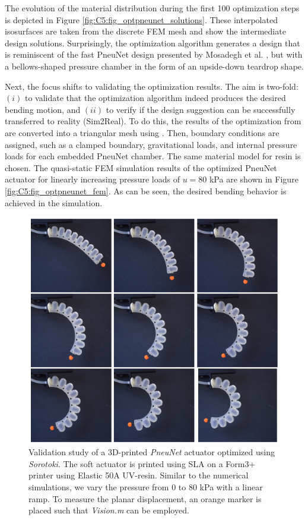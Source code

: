 The evolution of the material distribution during the first 100 optimization steps is depicted in Figure \ref{fig:C5:fig_optpneunet_solutions}. These interpolated isosurfaces are taken from the discrete FEM mesh and show the intermediate design solutions. Surprisingly, the optimization algorithm generates a design that is reminiscent of the fast PneuNet design presented by Mosadegh et al. \cite{Mosadegh2014}, but with a bellows-shaped pressure chamber in the form of an upside-down teardrop shape.

Next, the focus shifts to validating the optimization results. The aim is two-fold: $(i)$ to validate that the optimization algorithm indeed produces the desired bending motion, and $(ii)$ to verify if the design suggestion can be successfully transferred to reality (Sim2Real). To do this, the results of the optimization from  are converted into a triangular mesh using . Then, boundary conditions are assigned, such as a clamped boundary, gravitational loads, and internal pressure loads for each embedded PneuNet chamber. The same material model for  resin is chosen. The quasi-static FEM simulation results of the optimized PneuNet actuator for linearly increasing pressure loads of $u = 80$ \si{\kilo \pascal} are shown in Figure \ref{fig:C5:fig_optpneunet_fem}. As can be seen, the desired bending behavior is achieved in the simulation.

\begin{figure}[!t]
    \centering
    \includegraphics*[width=.825\textwidth]{./pdf/thesis-figure-6-24.pdf}
    \caption{Validation study of a 3D-printed \textit{PneuNet} actuator optimized using \textit{Sorotoki}. The soft actuator is printed using SLA on a Form3+ printer using Elastic 50A UV-resin. Similar to the numerical simulations, we vary the pressure from 0 to 80 \si{\kilo \pascal} with a linear ramp. To measure the planar displacement, an orange marker is placed such that \textit{Vision.m} can be employed.}
    \label{fig:C5:fig_optpneunet_exp}
\end{figure}

